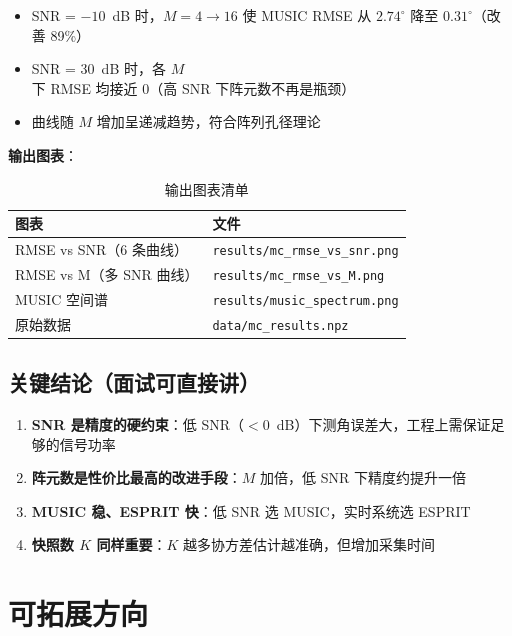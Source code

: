 \documentclass[11pt,a4paper]{article}
\newcommand{\code}[1]{\texttt{#1}}
\begin{document}
\begin{itemize}
    \item SNR = $-10$~dB 时，$M=4 \to 16$ 使 MUSIC RMSE 从 $2.74^\circ$ 降至 $0.31^\circ$（改善 89\%）
    \item SNR = $30$~dB 时，各 $M$ 下 RMSE 均接近 0（高 SNR 下阵元数不再是瓶颈）
    \item 曲线随 $M$ 增加呈递减趋势，符合阵列孔径理论
\end{itemize}

\textbf{输出图表}：

\begin{table}[H]
\centering
\caption{输出图表清单}
\begin{tabular}{ll}
\toprule
\textbf{图表} & \textbf{文件} \\
\midrule
RMSE vs SNR（6 条曲线） & \code{results/mc\_rmse\_vs\_snr.png} \\
RMSE vs M（多 SNR 曲线） & \code{results/mc\_rmse\_vs\_M.png} \\
MUSIC 空间谱 & \code{results/music\_spectrum.png} \\
原始数据 & \code{data/mc\_results.npz} \\
\bottomrule
\end{tabular}
\end{table}

\subsection{关键结论（面试可直接讲）}

\begin{enumerate}
    \item \textbf{SNR 是精度的硬约束}：低 SNR（$<0$~dB）下测角误差大，工程上需保证足够的信号功率
    \item \textbf{阵元数是性价比最高的改进手段}：$M$ 加倍，低 SNR 下精度约提升一倍
    \item \textbf{MUSIC 稳、ESPRIT 快}：低 SNR 选 MUSIC，实时系统选 ESPRIT
    \item \textbf{快照数 $K$ 同样重要}：$K$ 越多协方差估计越准确，但增加采集时间
\end{enumerate}

\section{可拓展方向}
\end{document}
